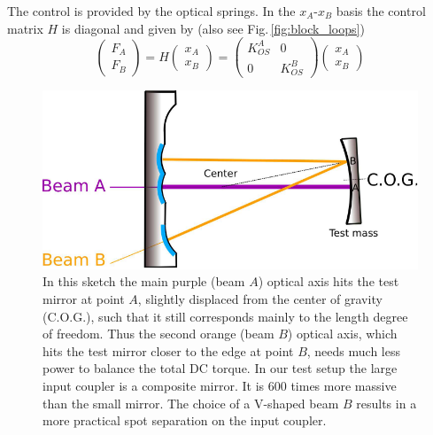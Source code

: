 The control is provided by the optical springs. In the $x_A$-$x_B$ basis the control matrix $H$ is diagonal and given by  (also see Fig.\,\ref{fig:block_loops})
\begin{equation}
\begin{pmatrix}
F_{A}\\ F_{B}
\end{pmatrix}
= H
 \begin{pmatrix}
x_A\\ x_B
\end{pmatrix} 
=  \begin{pmatrix}
K_{OS}^A & 0 \\ 0 & K_{OS}^B
\end{pmatrix} 
 \begin{pmatrix}
x_A\\ x_B
\end{pmatrix} 
\label{eq:HX}
\end{equation}

\begin{figure}[t]
	\centering
		\includegraphics[width=.7\textwidth]{figures/theory/trap_drawing_paper3.pdf}
	\caption[Trap drawing]{
	In this sketch the main purple (beam $A$) optical axis hits the test mirror %
	at point $A$, slightly displaced from the center of gravity (C.O.G.), such
	 that it still corresponds mainly to the length degree of freedom. Thus the second orange (beam $B$) optical axis, which hits the test mirror closer to the edge at point $B$, needs much less power to balance the total DC torque. In our test setup the large input coupler is a composite mirror. It is 600 times more massive than the small mirror. The choice of a V-shaped beam $B$ results in a more practical spot separation on the input coupler. }	

	\label{fig:angular}
\end{figure}



